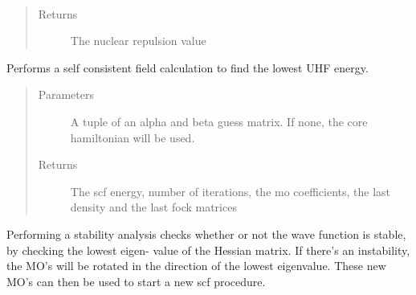 \documentclass[letterpaper,10pt,english]{sphinxmanual}
\begin{document}
\begin{fulllineitems}
\begin{fulllineitems}
\begin{quote}
\begin{description}
\end{description}\end{quote}

\end{fulllineitems}


\begin{fulllineitems}
\label{\detokenize{UHF:ghf.UHF.UHF.nuc_rep}}~\begin{quote}\begin{description}
\item[{Returns}] \leavevmode
The nuclear repulsion value

\end{description}\end{quote}

\end{fulllineitems}


\begin{fulllineitems}
\label{\detokenize{UHF:ghf.UHF.UHF.scf}}
Performs a self consistent field calculation to find the lowest UHF energy.
\begin{quote}\begin{description}
\item[{Parameters}] \leavevmode
{} \textendash{} A tuple of an alpha and beta guess matrix. If none, the core hamiltonian will be used.

\item[{Returns}] \leavevmode
The scf energy, number of iterations, the mo coefficients, the last density and the last fock matrices

\end{description}\end{quote}

\end{fulllineitems}


\begin{fulllineitems}
\label{\detokenize{UHF:ghf.UHF.UHF.stability}}
Performing a stability analysis checks whether or not the wave function is stable, by checking the lowest eigen-
value of the Hessian matrix. If there’s an instability, the MO’s will be rotated in the direction
of the lowest eigenvalue. These new MO’s can then be used to start a new scf procedure.


\end{fulllineitems}
\end{fulllineitems}
\end{document}
